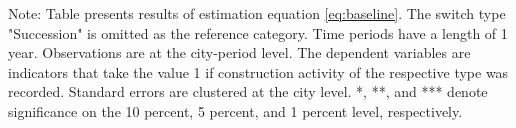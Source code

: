 \begin{table}[htbp]
\begin{tabular}{lcccc}
      
   \end{tabular}
   
   \par \raggedright 
   Note: Table presents results of estimation equation \eqref{eq:baseline}. The switch type "Succession" is omitted as the  reference category. Time periods have a length of 1 year. Observations are at the city-period  level. The dependent variables are indicators that take the value 1 if  construction activity of the respective type was recorded. Standard errors are  clustered at the city level. *, **, and *** denote significance on the 10 percent, 5 percent, and 1 percent  level, respectively.
\end{table}
